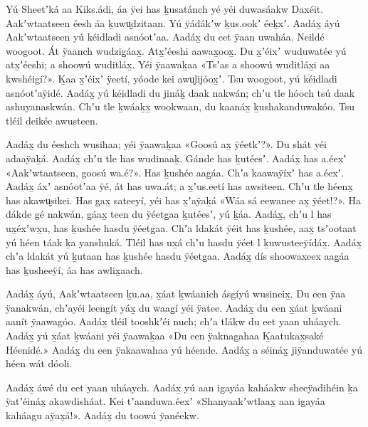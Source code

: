 \begin{pairs}
\begin{Leftside}
\beginnumbering
\pstart\noindent
{}Yú Sheetʼká aa Kiks.ádi, áa ÿei has ḵusatánch yé yéi duwasáakw Daxéit.
Aakʼwtaatseen éesh áa ḵuwu̬dzitaan.
Yú ÿádákʼw ḵus.ookʼ éeḵxʼ.
Aadáx̱ áyú Aakʼwtaatseen yú kéidladi asnóotʼaa.
Aadáx̱ du eet ÿaan uwaháa.
Neildé woogoot.
Át ÿaanch wudzig̱áax̱.
At\-x̱ʼéeshi aawax̱oox̱.
Du x̱ʼéixʼ wuduwatée yú atx̱ʼéeshi;
a shoowú wuditláx̱.
Yéi ÿaawa\-ḵaa «\!Tsʼas a shoowú wuditláx̱i aa kwshéigí?\!».
Ḵaa x̱ʼéixʼ ÿeetí, yóode kei awu̬lijóox̱ʼ.
Tsu woogoot, yú kéidladi asnóotʼaÿidé.
Aadáx̱ yú kéidladi du jináḵ daak nakwán; 
chʼu tle hóoch tsú daak ashuyanaskwán.
Chʼu tle ḵwáaḵx̱ wookwaan, du kaanáx̱ ḵushakandu\-wakóo.
Tsu tléil deikée awusteen.
\pend

\pstart
{}Aadáx̱ du éeshch wusihaa;
\:yéi ÿaawaḵaa «\!Goosú ax̱ ÿéetkʼ\!?\!».
Du shát yéi adaaÿaḵá.
Aadáx̱ chʼu tle has wudinaaḵ.
Gánde has ḵutéesʼ.
Aadáx̱ has a.éexʼ
«\!Aakʼwtaatseen, goosú wa.é?\!».
Has ḵushée aag̱áa.
Chʼa kaawaÿíxʼ has a.éexʼ.
Aadáx̱ áxʼ asnóotʼaa ÿé, át has uwa.át;
a x̱ʼus.eetí has awsiteen.
Chʼu tle héenx̱ has akawu̬sikei.
Has g̱ax̱ sateeyí, yéi has x̱ʼaÿaḵá
«\!Wáa sá eewanee ax̱ ÿéet\!!?\!».
Ha dákde gé nakwán, 
g̱áax̱ teen du ÿéetg̱aa ḵutéesʼ, yú ḵáa.
Aadáx̱, chʼu l has ux̱éxʼwx̱u, has ḵushée hasdu ÿéetg̱aa.
Chʼa ldakát ÿéit has ḵushée, aax̱ tsʼootaat yú héen táak ḵa yanshuká.
Tléil has ux̱á chʼu hasdu ÿéet l ḵuwusteeÿídáx̱.
Aadáx̱ chʼa ldakát yú ḵutaan has ḵushée hasdu ÿéetg̱aa.
Aadáx̱ dís shoowaxeex aag̱áa has ḵusheeÿí, áa has awlix̱aach.
\pend

\pstart
{}Aadáx̱ áyú, Aakʼwtaatseen ḵu.aa, x̱áat ḵwáa\-nich ásgíyú wusineix̱.
Du een ÿaa ÿanakwán, chʼayéi leengít yáx̱ du waag̱í yéi ÿatee.
Aadáx̱ du een x̱áat ḵwáani aanít ÿaawagóo.
Aadáx̱ tléil tooshkʼéi nuch;
chʼa tlákw du eet yaan uháaych.
Aadáx̱ yú x̱áat ḵwáani yéi ÿaawaḵaa
«\!Du een ÿaknag̱ahaa Ḵaatukax̱saké Héenidé.\!»
Aadáx̱ du een ÿa\-kaa\-wahaa yú héende.
Aadáx̱ a séináx̱ jiÿanduwatée yú héen wát dóoli.
\pend

\pstart
{}Aadáx̱ áwé du eet yaan uháaych.
Aadáx̱ yú aan ig̱ayáa kaháakw sheeÿadihéin ḵa ÿa\-tʼéináx̱ akawdisháat.
Kei tʼaanduwa.éexʼ
«\!Shanyaakʼwtlaax̱ aan ig̱ayáa kaháagu aÿa\-x̱á!\!».
Aadáx̱ du toowú ÿanéekw.
\pend


\end{Leftside}
\end{pairs}
